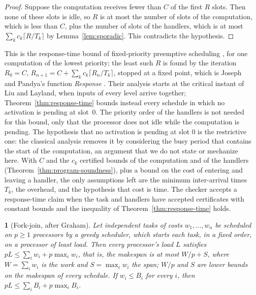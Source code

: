 \documentclass[oneside,english]{amsart}
\numberwithin{equation}{section}
\numberwithin{figure}{section}
\theoremstyle{plain}
\theoremstyle{definition}
\theoremstyle{plain}
\newtheorem{prop}[thm]{\protect\propositionname}
\theoremstyle{remark}
\theoremstyle{plain}
\theoremstyle{definition}
\theoremstyle{plain}
\theoremstyle{remark}
\providecommand{\propositionname}{Proposition}
\begin{document}
\begin{proof}
Suppose the computation receives fewer than $C$ of the first $R$ slots. Then none of these slots is idle, so $R$ is at most the number of slots of the computation, which is less than $C$, plus the number of slots of the handlers, which is at most $\sum_k c_k \lceil R/T_k \rceil$ by Lemma~\ref{lem:sporadic}. This contradicts the hypothesis.
\end{proof}

This is the response-time bound of fixed-priority preemptive scheduling \cite{joseph1986finding,audsley1993applying}, for one computation of the lowest priority; the least such $R$ is found by the iteration $R_0 = C$, $R_{n+1} = C + \sum_k c_k \lceil R_n / T_k \rceil$, stopped at a fixed point, which is Joseph and Pandya's function \emph{Response} \cite{joseph1986finding}. Their analysis starts at the critical instant of Liu and Layland, when inputs of every level arrive together; Theorem~\ref{thm:response-time} bounds instead every schedule in which no activation is pending at slot~$0$. The priority order of the handlers is not needed for this bound, only that the processor does not idle while the computation is pending. The hypothesis that no activation is pending at slot $0$ is the restrictive one: the classical analysis removes it by considering the busy period that contains the start of the computation, an argument that we do not state or mechanize here. With $C$ and the $c_k$ certified bounds of the computation and of the handlers (Theorem~\ref{thm:program-soundness}), plus a bound on the cost of entering and leaving a handler, the only assumptions left are the minimum inter-arrival times $T_k$, the overhead, and the hypothesis that cost is time. The checker accepts a response-time claim when the task and handlers have accepted certificates with constant bounds and the inequality of Theorem~\ref{thm:response-time} holds.

\begin{prop}[Fork-join, after Graham]
\label{prop:graham}
Let independent tasks of costs $w_1, \dots, w_n$ be scheduled on $p \ge 1$ processors by a greedy scheduler, which starts each task, in a fixed order, on a processor of least load. Then every processor's load $L$ satisfies $p L \le \sum_i w_i + p \max_i w_i$, that is, the makespan is at most $W/p + S$, where $W = \sum_i w_i$ is the work and $S = \max_i w_i$ the span; $W/p$ and $S$ are lower bounds on the makespan of every schedule. If $w_i \le B_i$ for every $i$, then $p L \le \sum_i B_i + p \max_i B_i$.
\end{prop}
\end{document}

